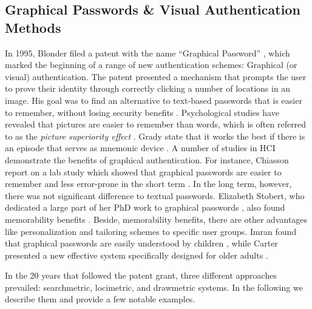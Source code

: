 	\subsection{Graphical Passwords \& Visual Authentication Methods}
	In 1995, Blonder filed a patent with the name ``Graphical Password'' \cite{Blonder1996PatentGraphicalPW}, which marked the beginning of a range of new authentication schemes: Graphical (or visual) authentication. The patent presented a mechanism that prompts the user to prove their identity through correctly clicking a number of locations in an image. His goal was to find an alternative to text-based passwords that is easier to remember, without losing security benefits \cite{Biddle2009GraphicalFirstTwelveYears, Renaud2009VisualSnakeOil}. Psychological studies have revealed that pictures are easier to remember than words, which is often referred to as the \textit{picture superiority effect} \cite{Paivio1968PicturesEasierThanWords}. Grady \etal state that it works the best if there is an episode that serves as mnemonic device \cite{Grady1998NeuralCorrelates}. A number of studies in HCI demonstrate the benefits of graphical authentication. For instance, Chiasson \etal report on a lab study which showed that graphical passwords are easier to remember and less error-prone in the short term \cite{Chiasson2009InterferencesGraphical}. In the long term, however, there was not significant difference to textual passwords. Elizabeth Stobert, who dedicated a large part of her PhD work to graphical passwords \cite{Stobert2015Dissertation}, also found memorability benefits \cite{Stobert2013GraphicalPasswords}. Beside, memorability benefits, there are other advantages like personalization and tailoring schemes to specific user groups. Imran found that graphical passwords are easily understood by children \cite{Imran2015PWsAdultsChildren}, while Carter presented a new effective system specifically designed for older adults \cite{Carter2015GraphicalPasswordsOlderUsers}. 
	
	In the 20 years that followed the patent grant, three different approaches prevailed: searchmetric, locimetric, and drawmetric systems. In the following we describe them and provide a few notable examples. 
		
